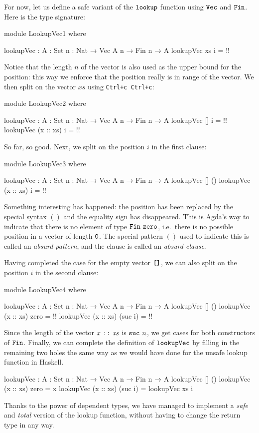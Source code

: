 \documentclass[a4paper,UKenglish]{tufte-handout}
\theoremstyle{definition}
\newcommand\var[1]{\mathit{#1}}
\newcommand\fun[1]{{\AgdaFunction{#1}}}
\newcommand\data[1]{{\AgdaFunction{#1}}}
\newcommand\con[1]{{\AgdaInductiveConstructor{#1}}}
\newcommand\lit[1]{{\AgdaNumber{#1}}}
\newcommand\zero{\con{zero}}
\newcommand\suc{\con{suc}}
\renewcommand\Vec{\data{Vec}}
\newcommand\nil{\con{[]}}
\newcommand\cons{\con{::}}
\newcommand\Fin{\data{Fin}}
\begin{document}
For now, let us define a safe variant of the $\fun{lookup}$ function
using $\Vec$ and $\Fin$. Here is the type signature:
\begin{code}[hide]
module LookupVec1 where
\end{code}
\begin{code}[number]
  lookupVec : {A : Set} {n : Nat} → Vec A n → Fin n → A
  lookupVec xs i = {!!}
\end{code}
Notice that the length $n$ of the vector is also used as the upper
bound for the position: this way we enforce that the position really is in
range of the vector. We then split on the vector $\var{xs}$ using \texttt{Ctrl+c Ctrl+c}:
\begin{code}[hide]
module LookupVec2 where
\end{code}
\begin{code}[number]
  lookupVec : {A : Set} {n : Nat} → Vec A n → Fin n → A
  lookupVec []         i = {!!}
  lookupVec (x :: xs)  i = {!!}
\end{code}
So far, so good. Next, we split on the position $i$ in the
first clause:
\begin{code}[hide]
module LookupVec3 where
\end{code}
\begin{code}[number]
  lookupVec : {A : Set} {n : Nat} → Vec A n → Fin n → A
  lookupVec []         ()
  lookupVec (x :: xs)  i   = {!!}
\end{code}
Something interesting has happened: the position has been replaced by
the special syntax $()$ and the equality sign
has disappeared. This is Agda's way to indicate that there is no
element of type $\Fin\ \zero$, i.e.~there is no possible position in a
vector of length $\lit{0}$. The special pattern $()$ used to indicate this
is called an \emph{absurd pattern}, and the clause is called an
\emph{absurd clause}.


Having completed the case for the empty vector $\nil$, we can
also split on the position $i$ in the second clause:
\begin{code}[hide]
module LookupVec4 where
\end{code}
\begin{code}[number]
  lookupVec : {A : Set} {n : Nat} → Vec A n → Fin n → A
  lookupVec []         ()
  lookupVec (x :: xs)  zero     = {!!}
  lookupVec (x :: xs)  (suc i)  = {!!}
\end{code}
Since the length of the vector $x\ \cons\ \var{xs}$ is $\suc\ n$,
we get cases for both constructors of $\Fin$.
Finally, we can complete the definition of $\fun{lookupVec}$ by
filling in the remaining two holes the same way as we would have done
for the unsafe lookup function in Haskell.
\begin{code}[number]
lookupVec : {A : Set} {n : Nat} → Vec A n → Fin n → A
lookupVec []         ()
lookupVec (x :: xs)  zero     = x
lookupVec (x :: xs)  (suc i)  = lookupVec xs i
\end{code}
Thanks to the power of dependent types, we have managed to implement a
\emph{safe} and \emph{total} version of the lookup function, without
having to change the return type in any way.
\end{document}
